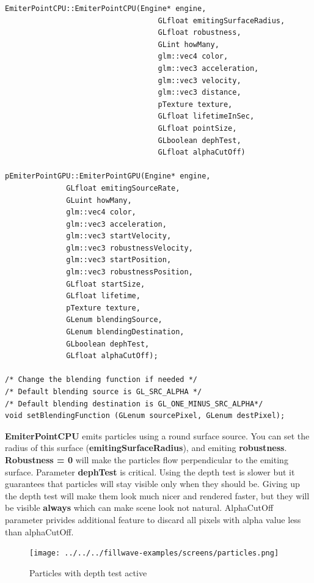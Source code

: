 \documentclass{article}
\begin{document}
\begin{lstlisting}
EmiterPointCPU::EmiterPointCPU(Engine* engine,
                                   GLfloat emitingSurfaceRadius,
                                   GLfloat robustness,
                                   GLint howMany,
                                   glm::vec4 color,
                                   glm::vec3 acceleration,
                                   glm::vec3 velocity,
                                   glm::vec3 distance,
                                   pTexture texture,
                                   GLfloat lifetimeInSec,
                                   GLfloat pointSize,
                                   GLboolean dephTest,
                                   GLfloat alphaCutOff)
                                   
pEmiterPointGPU::EmiterPointGPU(Engine* engine,
              GLfloat emitingSourceRate,
              GLuint howMany,
              glm::vec4 color,
              glm::vec3 acceleration,
              glm::vec3 startVelocity,
              glm::vec3 robustnessVelocity,
              glm::vec3 startPosition,
              glm::vec3 robustnessPosition,
              GLfloat startSize,
              GLfloat lifetime,
	          pTexture texture,
	          GLenum blendingSource,
	          GLenum blendingDestination,
	          GLboolean dephTest,
	          GLfloat alphaCutOff);

/* Change the blending function if needed */
/* Default blending source is GL_SRC_ALPHA */
/* Default blending destination is GL_ONE_MINUS_SRC_ALPHA*/
void setBlendingFunction (GLenum sourcePixel, GLenum destPixel);

\end{lstlisting}

\indent \textbf{EmiterPointCPU} emits particles using a round surface source. You can set the radius of this surface (\textbf{emitingSurfaceRadius}), and emiting \textbf{robustness}. \textbf{Robustness = 0} will make the particles flow perpendicular to the emiting surface. Parameter \textbf{dephTest} is critical. Using the depth test is slower but it guarantees that particles will stay visible only when they should be. Giving up the depth test will make them look much nicer and rendered faster, but they will be visible \textbf{always} which can make scene look not natural. AlphaCutOff parameter privides additional feature to discard all pixels with alpha value less than alphaCutOff.

\begin{figure}
    \centering
    \texttt{[image: ../../../fillwave-examples/screens/particles.png]}
    \caption{Particles with depth test active}
    \label{particle_depth_test}
\end{figure}
\end{document}
